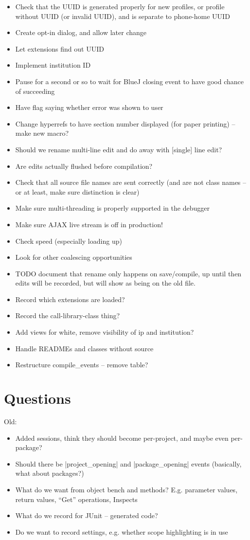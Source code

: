\documentclass{book}
\begin{document}
\begin{itemize}
\item Check that the UUID is generated properly for new profiles, or profile without
UUID (or invalid UUID), and is separate to phone-home UUID
\item Create opt-in dialog, and allow later change
\item Let extensions find out UUID
\item Implement institution ID
\item Pause for a second or so to wait for BlueJ closing event to have good
  chance of succeeding
\item Have flag saying whether error was shown to user
\item Change hyperrefs to have section number displayed (for paper printing)
  -- make new macro?
\item Should we rename multi-line edit and do away with [single] line edit?
\item Are edits actually flushed before compilation?
\item Check that all source file names are sent correctly (and are not class
  names -- or at least, make sure distinction is clear)
\item Make sure multi-threading is properly supported in the debugger
\item Make sure AJAX live stream is off in production!
\item Check speed (especially loading up)
\item Look for other coalescing opportunities
\item TODO document that rename only happens on save/compile, up until then
  edits will be recorded, but will show as being on the old file.
\item Record which extensions are loaded?
\item Record the call-library-class thing?
\item Add views for white, remove visibility of ip and institution?
\item Handle READMEs and classes without source
\item Restructure compile_events -- remove table?
\end{itemize}

\section{Questions}

Old:
\begin{itemize}
\item Added sessions, think they should become per-project, and maybe even per-package?
\item Should there be |project_opening| and |package_opening| events
  (basically, what about packages?)
\item What do we want from object bench and methods?  E.g. parameter values,
  return values, ``Get'' operations, Inspects
\item What do we record for JUnit -- generated code?
\item Do we want to record settings, e.g. whether scope highlighting is in
  use
\end{itemize}
\end{document}
